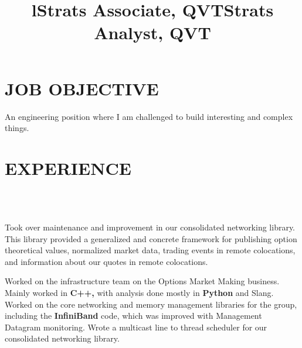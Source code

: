 \documentclass{res}
\begin{document}
 

\address{\\{\bf  PRESENT ADDRESS}\\251 W 15th St\\Apartment 26\\New York, NY 10011\\(630) 450-5725}
\address{\\{\bf PERMANENT ADDRESS}\\2558 Breckeridge Ct.\\Aurora, IL 60504 \\(630) 978-1952}


\begin{resume}
\section{JOB OBJECTIVE}
    An engineering position where I am challenged to build interesting and complex things.

\section{EXPERIENCE}
\begin{format}
  \title{l}  \\
  \body\\
\end{format}

\title{\bf Strats Associate, QVT}
\begin{position}
     Took over maintenance and improvement in our consolidated networking library. This library provided a generalized and concrete framework for publishing option theoretical values, normalized market data, trading events in remote colocations, and information about our quotes in remote colocations.
\end{position}

\title{\bf Strats Analyst, QVT}
\begin{position}
	Worked on the infrastructure team on the Options Market Making business. Mainly worked in {\bf C++, } with analysis done mostly in {\bf Python }and Slang.
	Worked on the core networking and memory management libraries for the group, including the {\bf InfiniBand} code, which was improved with Management Datagram monitoring. Wrote a multicast line to thread scheduler for our consolidated networking library.
\end{position}


\end{resume}
\end{document}
